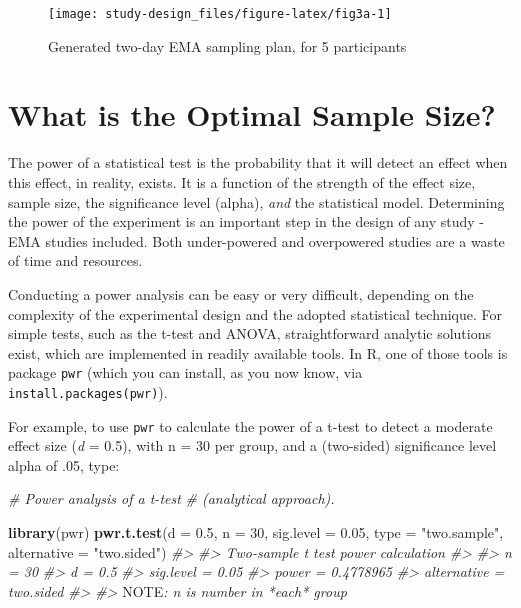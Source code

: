 \documentclass[]{book}
\newenvironment{Shaded}{\begin{snugshade}}{\end{snugshade}}
\newcommand{\KeywordTok}[1]{\textcolor[rgb]{0.13,0.29,0.53}{\textbf{#1}}}
\newcommand{\DataTypeTok}[1]{\textcolor[rgb]{0.13,0.29,0.53}{#1}}
\newcommand{\DecValTok}[1]{\textcolor[rgb]{0.00,0.00,0.81}{#1}}
\newcommand{\FloatTok}[1]{\textcolor[rgb]{0.00,0.00,0.81}{#1}}
\newcommand{\StringTok}[1]{\textcolor[rgb]{0.31,0.60,0.02}{#1}}
\newcommand{\CommentTok}[1]{\textcolor[rgb]{0.56,0.35,0.01}{\textit{#1}}}
\newcommand{\AlertTok}[1]{\textcolor[rgb]{0.94,0.16,0.16}{#1}}
\newcommand{\NormalTok}[1]{#1}
\begin{document}
\begin{figure}

{\centering \texttt{[image: study-design\_files/figure-latex/fig3a-1]} 

}

\caption{Generated two-day EMA sampling plan, for 5 participants}\label{fig:fig3a}
\end{figure}

\section{What is the Optimal Sample
Size?}\label{what-is-the-optimal-sample-size}

 

The power of a statistical test is the probability that it will detect
an effect when this effect, in reality, exists. It is a function of the
strength of the effect size, sample size, the significance level
(alpha), \emph{and} the statistical model. Determining the power of the
experiment is an important step in the design of any study - EMA studies
included. Both under-powered and overpowered studies are a waste of time
and resources.

Conducting a power analysis can be easy or very difficult, depending on
the complexity of the experimental design and the adopted statistical
technique. For simple tests, such as the t-test and ANOVA,
straightforward analytic solutions exist, which are implemented in
readily available tools. In R, one of those tools is package
\texttt{pwr} (which you can install, as you now know, via
\texttt{install.packages(\textquotesingle{}pwr\textquotesingle{})}).

For example, to use \texttt{pwr} to calculate the power of a t-test to
detect a moderate effect size (\emph{d} = 0.5), with n = 30 per group,
and a (two-sided) significance level alpha of .05, type:

\begin{Shaded}
\begin{Highlighting}[]
\CommentTok{# Power analysis of a t-test}
\CommentTok{# (analytical approach).}

\KeywordTok{library}\NormalTok{(pwr)}
\KeywordTok{pwr.t.test}\NormalTok{(}\DataTypeTok{d =} \FloatTok{0.5}\NormalTok{, }
           \DataTypeTok{n =} \DecValTok{30}\NormalTok{,}
           \DataTypeTok{sig.level =} \FloatTok{0.05}\NormalTok{,}
           \DataTypeTok{type =} \StringTok{"two.sample"}\NormalTok{,}
           \DataTypeTok{alternative =} \StringTok{"two.sided"}\NormalTok{)}
\CommentTok{#> }
\CommentTok{#>      Two-sample t test power calculation }
\CommentTok{#> }
\CommentTok{#>               n = 30}
\CommentTok{#>               d = 0.5}
\CommentTok{#>       sig.level = 0.05}
\CommentTok{#>           power = 0.4778965}
\CommentTok{#>     alternative = two.sided}
\CommentTok{#> }
\CommentTok{#> }\AlertTok{NOTE}\CommentTok{: n is number in *each* group}
\end{Highlighting}
\end{Shaded}
\end{document}
